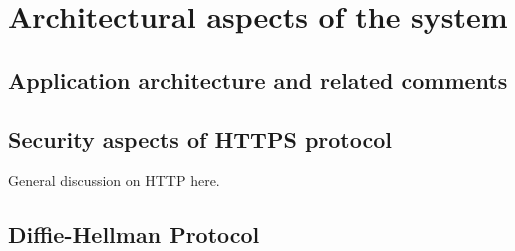 \chapter{Architectural aspects of the system}\label{ch:architectural-aspects-of-the-system}


\section{Application architecture and related comments}\label{sec:application-architecture-and-related-comments}


\section{Security aspects of HTTPS protocol}\label{sec:security-aspects-of-https-protocol}
General discussion on HTTP here.


\section{Diffie-Hellman Protocol}\label{sec:diffie-hellman-protocol}
